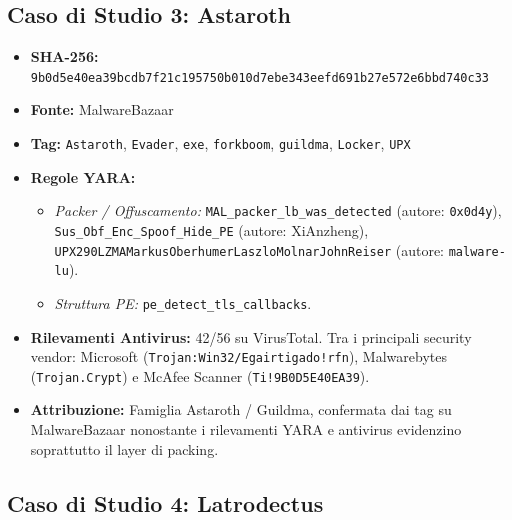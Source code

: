 \documentclass[11pt, a4paper]{article}
\begin{document}
	\subsection{Caso di Studio 3: Astaroth}
	
	\begin{itemize}
		\item \textbf{SHA-256:} {\small\texttt{9b0d5e40ea39bcdb7f21c195750b010d7ebe343eefd691b27e572e6bbd740c33}}
		\item \textbf{Fonte:} MalwareBazaar
		\item \textbf{Tag:} \texttt{Astaroth}, \texttt{Evader}, \texttt{exe}, \texttt{forkboom}, \texttt{guildma}, \texttt{Locker}, \texttt{UPX}
		\item \textbf{Regole YARA:}
		\begin{itemize}
			\item \textit{Packer / Offuscamento:} \texttt{MAL\_\allowbreak{}packer\_\allowbreak{}lb\_\allowbreak{}was\_\allowbreak{}detected} (autore: \texttt{0x0d4y}), \texttt{Sus\_\allowbreak{}Obf\_\allowbreak{}Enc\_\allowbreak{}Spoof\_\allowbreak{}Hide\_\allowbreak{}PE} (autore: XiAnzheng), \texttt{UPX290LZMA\allowbreak{}Markus\allowbreak{}Oberhumer\allowbreak{}Laszlo\allowbreak{}Molnar\allowbreak{}John\allowbreak{}Reiser} (autore: \texttt{malware-lu}).
			\item \textit{Struttura PE:} \texttt{pe\_\allowbreak{}detect\_\allowbreak{}tls\_\allowbreak{}callbacks}.
		\end{itemize}
		\item \textbf{Rilevamenti Antivirus:} 42/56 su VirusTotal. Tra i principali security vendor: Microsoft (\texttt{Trojan:Win32/\allowbreak{}Egairtigado!rfn}), Malwarebytes (\texttt{Trojan.Crypt}) e McAfee Scanner (\texttt{Ti!9B0D5E40EA39}).
		\item \textbf{Attribuzione:} Famiglia Astaroth / Guildma, confermata dai tag su MalwareBazaar nonostante i rilevamenti YARA e antivirus evidenzino soprattutto il layer di packing.
	\end{itemize}
	
	\subsection{Caso di Studio 4: Latrodectus}
	
\end{document}
